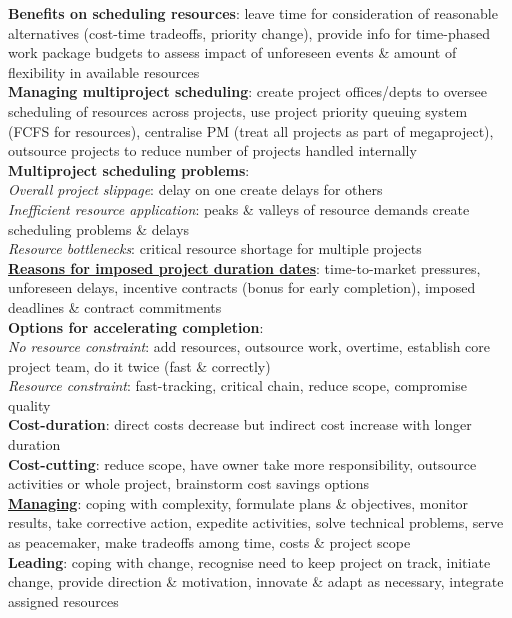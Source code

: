 \documentclass[a4paper]{article}
\begin{document}
\begin{multicols}{3}
        \textbf{Benefits on scheduling resources}: leave time for consideration of reasonable alternatives (cost-time tradeoffs, priority change), provide info for time-phased work package budgets to assess impact of unforeseen events \& amount of flexibility in available resources\\
        \textbf{Managing multiproject scheduling}: create project offices/depts to oversee scheduling of resources across projects, use project priority queuing system (FCFS for resources), centralise PM (treat all projects as part of megaproject), outsource projects to reduce number of projects handled internally\\
        \textbf{Multiproject scheduling problems}:\\
        \textit{Overall project slippage}: delay on one create delays for others\\
        \textit{Inefficient resource application}: peaks \& valleys of resource demands create scheduling problems \& delays\\
        \textit{Resource bottlenecks}: critical resource shortage for multiple projects\\
        \underline{\textbf{Reasons for imposed project duration dates}}: time-to-market pressures, unforeseen delays, incentive contracts (bonus for early completion), imposed deadlines \& contract commitments\\
        \textbf{Options for accelerating completion}:\\
        \textit{No resource constraint}: add resources, outsource work, overtime, establish core project team, do it twice (fast \& correctly)\\
        \textit{Resource constraint}: fast-tracking, critical chain, reduce scope, compromise quality\\
        \textbf{Cost-duration}: direct costs decrease but indirect cost increase with longer duration\\
        \textbf{Cost-cutting}: reduce scope, have owner take more responsibility, outsource activities or whole project, brainstorm cost savings options\\
        \underline{\textbf{Managing}}: coping with complexity, formulate plans \& objectives, monitor results, take corrective action, expedite activities, solve technical problems, serve as peacemaker, make tradeoffs among time, costs \& project scope\\
        \textbf{Leading}: coping with change, recognise need to keep project on track, initiate change, provide direction \& motivation, innovate \& adapt as necessary, integrate assigned resources\\

\end{multicols}
\end{document}
